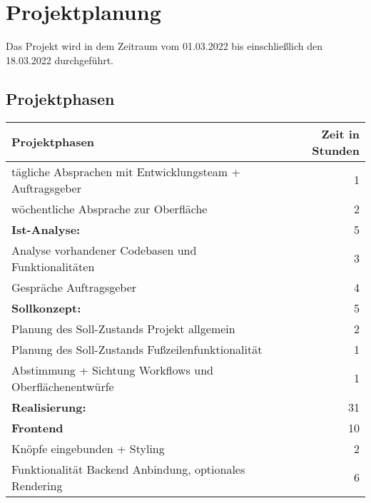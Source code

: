 \newpage
\section{Projektplanung}
\label{projektplanung}
Das Projekt wird in dem Zeitraum vom 01.03.2022  bis einschließlich den 18.03.2022 durchgeführt. %

\subsection{Projektphasen}
\label{projektphasen}

{
\begin{tabular}{|l|r|}
	\hline
	\textbf{Projektphasen }                                  & \textbf{Zeit in Stunden} \\ \hline
	tägliche Absprachen mit Entwicklungsteam + Auftragsgeber &                        1 \\
	wöchentliche Absprache zur Oberfläche                    &                        2 \\
	\textbf{Ist-Analyse: }                                   &                        5 \\
	Analyse vorhandener Codebasen und Funktionalitäten       &                        3 \\
	Gespräche Auftragsgeber                                  &                        4 \\
	\textbf{Sollkonzept:  }                                  &                        5 \\
	Planung des Soll-Zustands Projekt allgemein              &                        2 \\
	Planung des Soll-Zustands Fußzeilenfunktionalität        &                        1 \\
	Abstimmung + Sichtung Workflows und Oberflächenentwürfe  &                        1 \\
	\textbf{Realisierung: }                                  &                       31 \\
	\textbf{Frontend  }                                      &                       10 \\
	Knöpfe eingebunden + Styling                             &                        2 \\
	Funktionalität Backend Anbindung, optionales Rendering   &                        6 \\

\end{tabular}}
